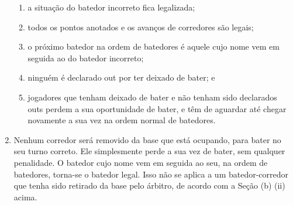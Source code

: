 \begin{enumerate}[label=(\alph*)]
	 \begin{enumerate}[label=\roman*.]
 		\item a situação do batedor incorreto fica legalizada;
		\item todos os pontos anotados e os avanços de corredores são legais;
		\item  o próximo batedor na ordem de batedores é aquele cujo nome vem em seguida ao do batedor incorreto;
		\item  ninguém é declarado \gls{out} por ter deixado de bater; e
		\item jogadores que tenham deixado de bater e não tenham sido declarados \gls{out}s perdem a sua oportunidade de bater, e têm de aguardar até chegar  novamente a sua vez na ordem normal de batedores.
	\end{enumerate}

	\item  Nenhum corredor será removido da base que está ocupando, para bater no seu turno correto. Ele simplesmente perde a sua vez de bater, sem qualquer  penalidade. O batedor cujo nome vem em seguida ao seu, na ordem de batedores, torna-se o batedor legal. Isso não se aplica a um batedor-corredor  que tenha sido retirado da base pelo árbitro, de acordo com a Seção (b) (ii) acima.

\end{enumerate}

